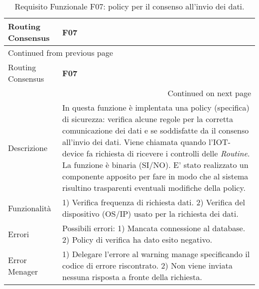 \documentclass[onecolumn,a4paper]{article}
\begin{document}
\begin{longtable}{|p{3cm}|p{10cm}|}
\caption{Requisito Funzionale F07: policy per il consenso all'invio dei dati.}
\\
\cellcolor{grey!15}Routing Consensus & \cellcolor{grey!15} \textbf{F07}\\
\hline
\endfirsthead
\multicolumn{2}{l}{Continued from previous page} \\
\hline

\cellcolor{grey!15}Routing Consensus & \cellcolor{grey!15} \textbf{F07} \\

\hline
\endhead
\hline\multicolumn{2}{r}{Continued on next page} \\
\endfoot
\endlastfoot
\hline
Descrizione & In questa funzione è implentata una policy (specifica) di sicurezza: verifica alcune regole per la corretta comunicazione dei dati e se soddisfatte da il consenso all'invio dei dati. Viene chiamata quando l'IOT-device fa richiesta di ricevere i controlli delle \emph{Routine}. La funzione è binaria (SI/NO). E' stato realizzato un componente apposito per fare in modo che al sistema risultino trasparenti eventuali modifiche della policy.\\
\hline
Funzionalità & 1) Verifica frequenza di richiesta dati. 2) Verifica del dispositivo (OS/IP) usato per la richiesta dei dati.\\
\hline
Errori & Possibili errori: 1) Mancata connessione al database. 2) Policy di verifica ha dato esito negativo.\\
\hline
Error Menager & 1) Delegare l'errore al warning manage specificando il codice di errore riscontrato. 2) Non viene inviata nessuna risposta a fronte della richiesta.\\
\hline
\end{longtable}
\end{document}
